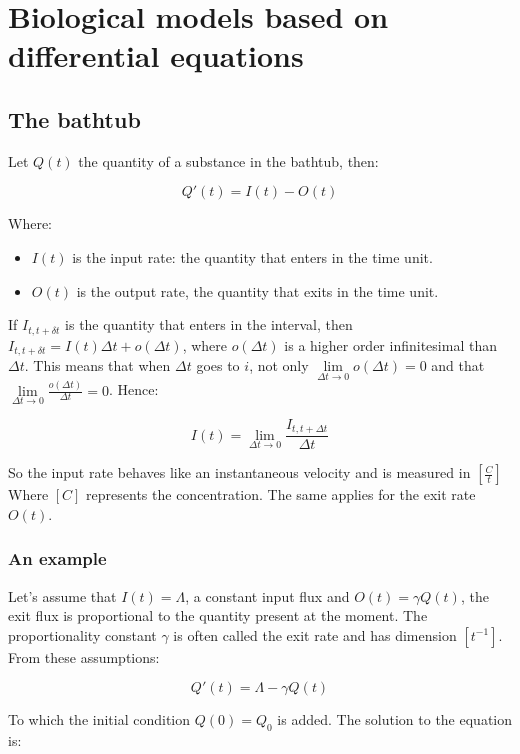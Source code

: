 \chapter{Biological models based on differential equations}

\section{The bathtub}
Let $Q(t)$ the quantity of a substance in the bathtub, then:

$$Q'(t) = I(t) - O(t)$$

Where:

\begin{multicols}{2}
	\begin{itemize}
		\item $I(t)$ is the input rate: the quantity that enters in the time unit.
		\item $O(t)$ is the output rate, the quantity that exits in the time unit.
	\end{itemize}
\end{multicols}

If $I_{t, t+\delta t}$ is the quantity that enters in the interval, then $I_{t, t+\delta t} = I(t)\Delta t + o(\Delta t)$, where $o(\Delta t)$ is a higher order infinitesimal than $\Delta t$.
This means that when $\Delta t$ goes to $i$, not only $\lim\limits_{\Delta t \rightarrow 0}o(\Delta t) = 0$ and that $\lim\limits_{\Delta t\rightarrow 0}\frac{o(\Delta t)}{\Delta t} = 0$.
Hence:

$$I(t) = \lim\limits_{\Delta t\rightarrow 0}\frac{I_{t, t+\Delta t}}{\Delta t}$$

So the input rate behaves like an instantaneous velocity and is measured in $[\frac{C}{t}]$ Where $[C]$ represents the concentration.
The same applies for the exit rate $O(t)$.

	\subsection{An example}
	Let's assume that $I(t) = \Lambda$, a constant input flux and $O(t) = \gamma Q(t)$, the exit flux is proportional to the quantity present at the moment.
	The proportionality constant $\gamma$ is often called the exit rate and has dimension $[t^{-1}]$.
	From these assumptions:

	$$Q'(t) = \Lambda - \gamma Q(t)$$

	To which the initial condition $Q(0) = Q_0$ is added.
	The solution to the equation is:

